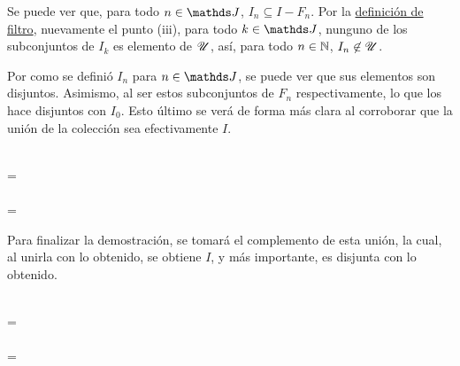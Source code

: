 \begin{demo}
  Se puede ver que, para todo $n\in\J$, $I_n \subseteq I - F_n$. Por la
  \hyperref[def:filtro]{definición de filtro}, nuevamente el punto (iii),
  para todo $k\in\J$, nunguno de los subconjuntos de $I_k$ es elemento de $\mathscr{U}$,
  así, para todo $n\in\mathbb{N}$, $I_n\not\in\mathscr{U}$.
  
  Por como se definió $I_n$ para $n\in\J$, se puede ver que sus
  elementos son disjuntos. Asimismo, al ser estos subconjuntos de $F_n$ respectivamente, lo que los hace disjuntos con $I_0$. Esto último se verá
  de forma más clara al corroborar que la unión de la colección sea
  efectivamente $I$.
  \begin{longderivation}
      \\
    =\\
      \\
    =\\
  \end{longderivation}

  Para finalizar la demostración, se tomará el complemento de esta unión,
  la cual, al unirla con lo obtenido, se obtiene $I$, y más importante, es
  disjunta con lo obtenido.
  \begin{longderivation}
      \\
    =\\
      \\
    =\\
  \end{longderivation}
\end{demo}


